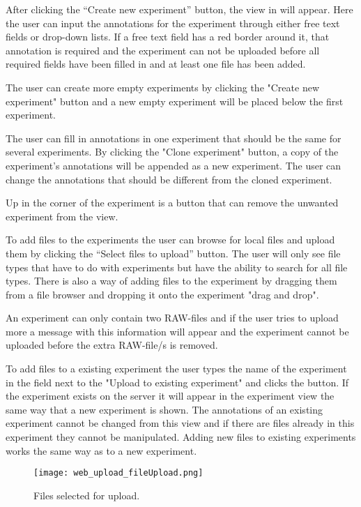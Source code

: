 After clicking the “Create new experiment” button, the view in  will appear. Here the user can input the annotations for the experiment through either free text fields or drop-down lists. If a free text field has a red border around it, that annotation is required and the experiment can not be uploaded before all required fields have been filled in and at least one file has been added.

The user can create more empty experiments by clicking the "Create new experiment" button and a new empty experiment will be placed below the first experiment.

The user can fill in annotations in one experiment that should be the same for several experiments. By clicking the "Clone experiment" button, a copy of the experiment's annotations will be appended as a new experiment. The user can change the annotations that should be different from the cloned experiment.

Up in the corner of the experiment is a button that can remove the unwanted experiment from the view. 

To add files to the experiments the user can browse for local files and upload them by clicking the “Select files to upload” button. The user will only see file types that have to do with experiments but have the ability to search for all file types. There is also a way of adding files to the experiment by dragging them from a file browser and dropping it onto the experiment "drag and drop".

An experiment can only contain two RAW-files and if the user tries to upload more a message with this information will appear and the experiment cannot be uploaded before the extra RAW-file/s is removed. 

To add files to a existing experiment the user types the name of the experiment in the field next to the "Upload to existing experiment" and clicks the button. If the experiment exists on the server it will appear in the experiment view the same way that a new experiment is shown. The annotations of an existing experiment cannot be changed from this view and if there are files already in this experiment they cannot be manipulated. Adding new files to existing experiments works the same way as to a new experiment.

\begin{figure}[h]
\centering
\texttt{[image: web\_upload\_fileUpload.png]}
\caption{\label{fig:web_upload_fileUpload}Files selected for upload.}
\end{figure}
 
